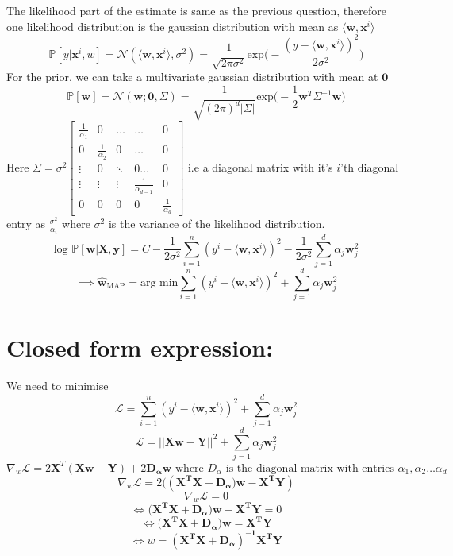 \documentclass[a4paper,11pt]{article}
\begin{document}
\begin{mlsolution}
The likelihood part of the estimate is same as the previous question, therefore one likelihood distribution is  the gaussian distribution with mean as $\langle \mathbf{w,x}^i \rangle$ \[
\mathbb{P}[y|\mathbf{x}^i,w] = \mathcal{N}(\langle \mathbf{w,x}^i \rangle,\sigma^2) = \frac{1}{\sqrt{2\pi\sigma^2}} \text{exp}\bigg(-\frac{(y-\langle \mathbf{w,x}^i \rangle)^2}{2\sigma^2}\bigg)
\]
For the prior, we can take a multivariate gaussian distribution with mean at $\mathbf{0}$\[
\mathbb{P}[\mathbf{w}] = \mathcal{N}(\mathbf{w};\mathbf{0},\Sigma) = \frac{1}{\sqrt{(2\pi)^d |\Sigma|}} \text{exp}\bigg(-\frac{1}{2}\mathbf{w}^T\Sigma^{-1}\mathbf{w}\bigg)
\]
Here $\Sigma = \sigma^2
\begin{bmatrix} 
\frac{1}{\alpha_1} & 0 & \dots & \dots & 0
\\ 0 & \frac{1}{\alpha_2} & 0 & \dots & 0
\\ \vdots & 0 & \ddots & 0\dots & 0
\\ \vdots & \vdots & \vdots & \frac{1}{\alpha_{d-1}} & 0
\\ 0 & 0 & 0 & 0 & \frac{1}{\alpha_d}
\end{bmatrix}$ i.e a diagonal matrix with it's $i$'th diagonal entry as $\frac{\sigma^2}{\alpha_i}$ where $\sigma^2$ is the variance of the likelihood distribution.\[
\text{log }\mathbb{P}[\mathbf{w|X,y}] = C -\frac{1}{2\sigma^2}\sum_{i=1}^{n}(y^i-\langle \mathbf{w,x}^i \rangle)^2 -\frac{1}{2\sigma^2}\sum_{j=1}^{d} \alpha_j \mathbf{w}_j^2 \]
\[ \implies \mathbf{\hat{w}}_{\text{MAP}} = \text{arg min} \sum_{i=1}^{n}(y^i-\langle \mathbf{w,x}^i \rangle)^2 + \sum_{j=1}^{d} \alpha_j \mathbf{w}_j^2   \]

\section*{Closed form expression:}
We need to minimise \[ \mathcal{L} =  \sum_{i=1}^{n}(y^i-\langle \mathbf{w,x}^i \rangle)^2 + \sum_{j=1}^{d} \alpha_j \mathbf{w}_j^2   \]
 \[ \mathcal{L} =  ||\mathbf{Xw - Y}||^2 + \sum_{j=1}^{d} \alpha_j \mathbf{w}_j^2   \]
 \[ \nabla_w \mathcal{L} = 2\mathbf{X}^T(\mathbf{Xw - Y}) + 2\mathbf{D_{\alpha}w} \text{ where } D_{\alpha} \text{ is the diagonal matrix with entries } \alpha_1,\alpha_2 \dots \alpha_d \]
 \[ \nabla_w \mathcal{L} = 2((\mathbf{X^T X + D_{\alpha})w} -\mathbf{X^T Y})\]
 \[\nabla_w \mathcal{L}= 0  \]
 \[ \iff (\mathbf{X^T X + D_{\alpha})w} -\mathbf{X^T Y} = 0 \]
 \[ \iff (\mathbf{X^T X + D_{\alpha})w}  = \mathbf{X^T Y} \]
 \[ \iff w = \mathbf{(X^T X + D_{\alpha})^{-1} X^T Y} \]
\end{mlsolution}
\end{document}
